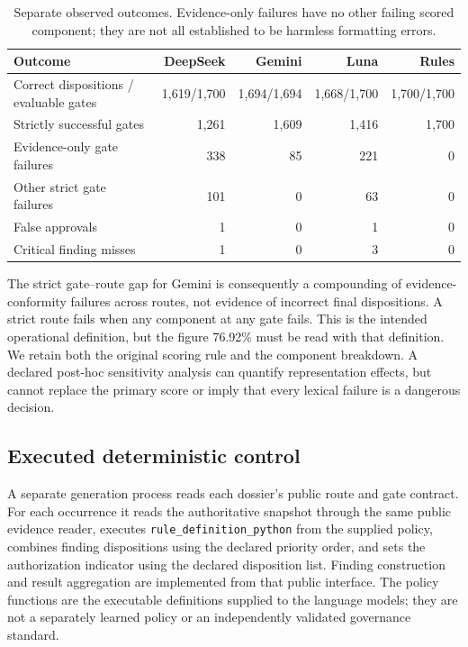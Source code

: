 \begin{table}[!htb]
\centering\small
\caption{Separate observed outcomes. Evidence-only failures have no other failing scored component;
they are not all established to be harmless formatting errors.}
\begin{tabularx}{\linewidth}{@{}Lrrrr@{}}
\toprule
Outcome & DeepSeek & Gemini & Luna & Rules\\
\midrule
Correct dispositions / evaluable gates & 1,619/1,700 & 1,694/1,694 & 1,668/1,700 & 1,700/1,700\\
Strictly successful gates & 1,261 & 1,609 & 1,416 & 1,700\\
Evidence-only gate failures & 338 & 85 & 221 & 0\\
Other strict gate failures & 101 & 0 & 63 & 0\\
False approvals & 1 & 0 & 1 & 0\\
Critical finding misses & 1 & 0 & 3 & 0\\
\bottomrule
\end{tabularx}
\end{table}

The strict gate--route gap for Gemini is consequently a compounding of evidence-conformity
failures across routes, not evidence of incorrect final dispositions. A strict route fails
when any component at any gate fails. This is the intended operational definition, but the
figure 76.92\% must be read with that definition. We retain both the original scoring rule and
the component breakdown. A declared post-hoc sensitivity analysis can quantify representation effects, but cannot
replace the primary score or imply that every lexical failure is a dangerous decision.

\subsection{Executed deterministic control}
\label{sec:rules-control}

A separate generation process reads each dossier's public route and gate contract. For each
occurrence it reads the authoritative snapshot through the same public evidence reader, executes
\texttt{rule\_definition\_python} from the supplied policy, combines finding dispositions using
the declared priority order, and sets the authorization indicator using the declared disposition
list. Finding construction and result aggregation are implemented from that public interface.
The policy functions are the executable definitions supplied to the language models; they are
not a separately learned policy or an independently validated governance standard.

